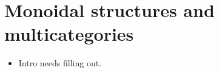 \documentclass{amsart}
\begin{document}
\section{Monoidal structures and multicategories}

\begin{itemize}
\item Intro needs filling out.

\end{itemize}
\end{document}
